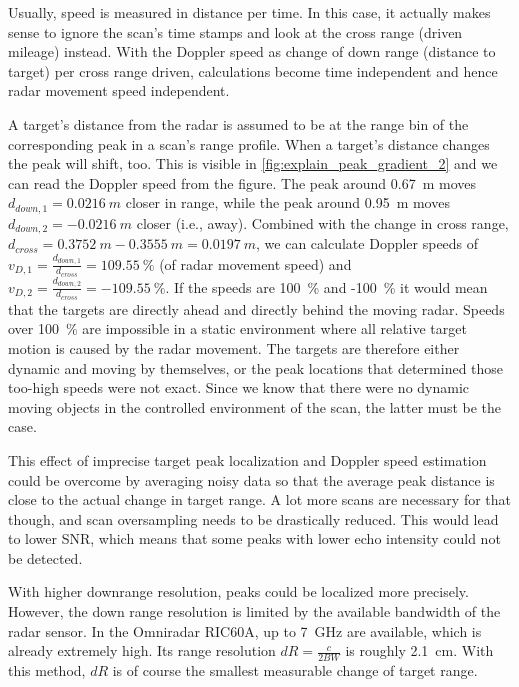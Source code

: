Usually, speed is measured in distance per time. In this case, it
actually makes sense to ignore the scan's time stamps and look at the
cross range (driven mileage) instead. With the Doppler speed as change
of down range (distance to target) per cross range driven, calculations
become time independent and hence radar movement speed independent.

A target's distance from the radar is assumed to be at the range bin of
the corresponding peak in a scan's range profile. When a target's
distance changes the peak will shift, too. This is visible in \cref{fig:explain_peak_gradient_2} and we can read the Doppler speed from the figure. The peak around \SI{0.67}{m} moves \(d_{down,1} = \SI{0.0216}{m}\) closer in range, while the peak
around \SI{0.95}{m} moves \(d_{down,2} = -\SI{0.0216}{m}\) closer (i.e., away).
Combined with the change in cross range,
\(d_{cross} = \SI{0.3752}{m} - \SI{0.3555}{m} = \SI{0.0197}{m}\), we can calculate Doppler
speeds of \(v_{D,1} = \frac{d_{down,1}}{d_{cross}} = \SI{109.55}{\%}\) (of
radar movement speed) and
\(v_{D,2} = \frac{d_{down,2}}{d_{cross}} = -\SI{109.55}{\%}\).
If the speeds are \SI{100}{\%} and -\SI{100}{\%} it would mean that the targets are directly
ahead and directly behind the moving radar. Speeds over \SI{100}{\%} are impossible in a static environment where all relative target
motion is caused by the radar movement. The targets are therefore either
dynamic and moving by themselves, or the peak locations that determined
those too-high speeds were not exact. Since we know that there were no
dynamic moving objects in the controlled environment of the scan, the
latter must be the case.

This effect of imprecise target peak localization and Doppler speed
estimation could be overcome by averaging noisy data so that the average
peak distance is close to the actual change in target range. A lot more
scans are necessary for that though, and scan oversampling needs to be
drastically reduced. This would lead to lower SNR, which means that some
peaks with lower echo intensity could not be detected.

With higher downrange resolution, peaks could be localized more
precisely. However, the down range resolution is limited by the
available bandwidth of the radar sensor. In the Omniradar RIC60A, up to
\SI{7}{GHz} are available, which is already extremely high. Its range
resolution \(dR=\frac{c}{2 BW}\) is roughly \SI{2.1}{cm}. With
this method, \(dR\) is of course the smallest measurable change of
target range.


